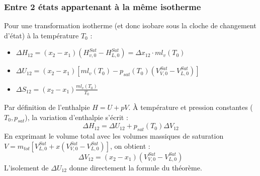 \documentclass[french]{yLectureNote}
\begin{document}

\subsubsection{Entre 2 états appartenant à la même isotherme}


\begin{theorem}
    Pour une transformation isotherme (et donc isobare sous la cloche de changement d'état) à la température $T_0$ :
    \begin{itemize}
        \item $\Delta H_{12} = (x_2 - x_1)(H_{v,0}^{Sat}-H_{L,0}^{Sat}) = \Delta x_{12} \cdot m l_v(T_0)$
        \item $\Delta U_{12} = (x_2-x_1)\left[ml_v(T_0)-p_{sat}(T_0)(V_{V,0}^{Sat}-V_{L,0}^{Sat})\right]$
        \item $\Delta S_{12} = (x_2-x_1)\frac{ml_v(T_0)}{T_0}$
    \end{itemize}
\end{theorem}

\begin{myproof}
    Par définition de l'enthalpie $H = U + pV$. À température et pression constantes ($T_0, p_{sat}$), la variation d'enthalpie s'écrit :
    \[ \Delta H_{12} = \Delta U_{12} + p_{sat}(T_0) \Delta V_{12} \]
    En exprimant le volume total avec les volumes massiques de saturation $V = m_{tot} \left[ V_{L,0}^{Sat} + x(V_{V,0}^{Sat} - V_{L,0}^{Sat}) \right]$, on obtient :
    \[ \Delta V_{12} = (x_2 - x_1)(V_{V,0}^{Sat}-V_{L,0}^{Sat}) \]
    L'isolement de $\Delta U_{12}$ donne directement la formule du théorème.
\end{myproof}
\end{document}
